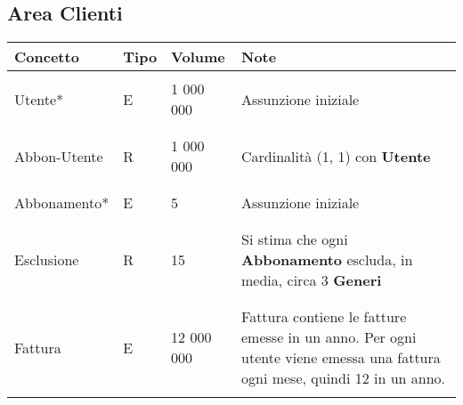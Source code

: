 \documentclass{article}
\begin{document}
\subsection{Area Clienti}
\begin{tabular}{|C{2.3cm}|C{0.7cm}|C{1.7cm}|C{6.2cm}|}
\hline
    \textbf{Concetto} & \textbf{Tipo} & \textbf{Volume} & \textbf{Note} \\
\hline
\hline
& & & \\
    Utente* & E & 1 000 000 & Assunzione iniziale \\
& & & \\
\hline
& & & \\    
    Abbon-Utente & R & 1 000 000 & Cardinalità (1, 1) con \textbf{Utente} \\
& & & \\
\hline
& & & \\    
    Abbonamento* & E & 5 & Assunzione iniziale \\
& & & \\
\hline
& & & \\    
    Esclusione & R & 15 & Si stima che ogni \textbf{Abbonamento} escluda, in media, circa 3 \textbf{Generi} \\
& & & \\
\hline
& & & \\    
    Fattura & E & 12 000 000 & Fattura contiene le fatture emesse in un anno. Per ogni utente viene emessa una fattura ogni mese, quindi 12 in un anno. \\
& & & \\
\hline
\end{tabular} \\ \\
\end{document}
